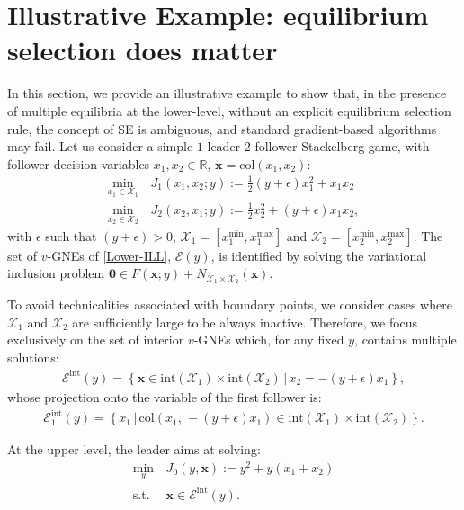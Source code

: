 \documentclass[letterpaper, 10 pt, conference]{ieeeconf}
\newcommand{\real}{\mathbb{R}}
\newcommand\xbf{\mathbf{x}}
\begin{document}
\section{Illustrative Example: equilibrium selection does matter}\label{Illustrative}
In this section, we provide an illustrative example to show that, in the presence of multiple equilibria at the lower-level, without an explicit equilibrium selection rule, the concept of SE is ambiguous, and standard gradient-based algorithms may fail. Let us consider a simple $1$-leader $2$-follower Stackelberg game, with follower decision variables $x_1, x_2 \in \real$, $\xbf=\mathrm{col}(x_1,x_2)$:
\begin{subequations}\label{Lower-ILL}
\begin{align}
\underset{ x_1 \in \mathcal{X}_1} {\min} \, & J_1(x_1, x_2; y):=\frac{1}{2} (y+\epsilon)x_1^2+ x_1x_2\\
\underset{x_2 \in \mathcal{X}_2} {\min} \, & J_2(x_2, x_1; y):=\frac{1}{2} x_2^2+(y+\epsilon) x_1x_2,
\end{align}
\end{subequations}
with $\epsilon$ such that $(y+\epsilon)>0$, $\mathcal{X}_1=\left[x_1^{\min}, x_1^{\max}\right]$ and $\mathcal{X}_2=\left[x_2^{\min}, x_2^{\max}\right]$. 
The set of $v$-GNEs of \eqref{Lower-ILL}, $\mathcal{E}(y)$, is identified by solving the variational inclusion problem $\mathbf{0} \in F(\xbf; y)+N_{\mathcal{X}_1\times\mathcal{X}_2}(\xbf)$.

To avoid technicalities associated with boundary points, we consider cases where $\mathcal{X}_1$ and $\mathcal{X}_2$ are sufficiently large to be always inactive. Therefore, we focus exclusively on the set of interior $v$-GNEs which, for any fixed $y$, contains multiple solutions:
\begin{align*}
\mathcal{E}^\mathrm{int}(y)=\left\{\xbf\in \mathrm{int}(\mathcal{X}_1)\times \mathrm{int}(\mathcal{X}_2) \, |  \,x_2 = -(y+\epsilon)x_1\right\},
\end{align*}
whose projection onto the variable of the first follower is:
\begin{align*}
{\mathcal{E}}_1^\mathrm{int}(y)=\left\{x_{1}\, |\, \mathrm{col}\left(x_{1 }, \, -(y+\epsilon)x_{1 }\right) \in \mathrm{int}(\mathcal{X}_1) \times \mathrm{int}(\mathcal{X}_2)\right\}.
\end{align*}

At the upper level, the leader aims at solving:
\begin{equation}\label{Stackelberg-ILL}
\begin{aligned}
\underset{y} {\min} \, & J_0(y,\xbf):=y^2+y(x_1+x_2)
\\
\mathrm{s. t.} \, \,  &\xbf\in \mathcal{E}^\mathrm{int}(y).
\end{aligned}
\end{equation}
\end{document}
